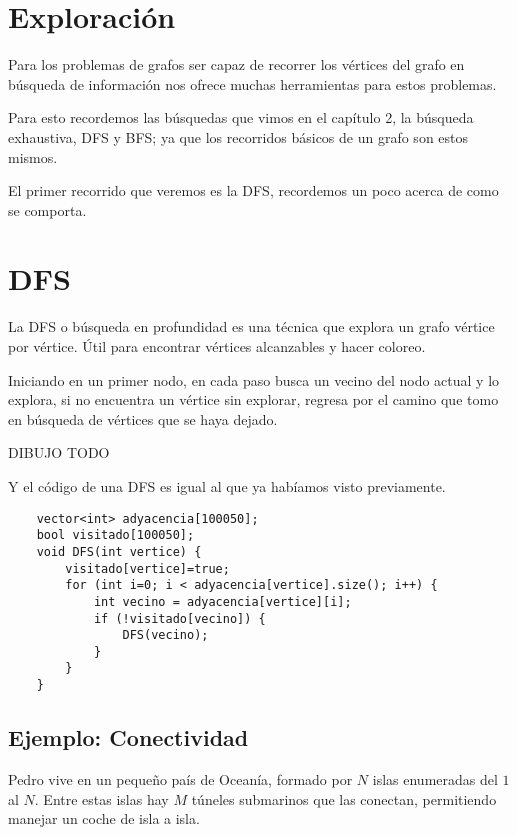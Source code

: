 \chapter{Exploración}

Para los problemas de grafos ser capaz de recorrer los vértices del grafo en búsqueda de información nos ofrece muchas herramientas para estos problemas.  

Para esto recordemos las búsquedas que vimos en el capítulo 2, la búsqueda exhaustiva, DFS y BFS; ya que los recorridos básicos de un grafo son estos mismos.

El primer recorrido que veremos es la DFS, recordemos un poco acerca de como se comporta.

\chapter{DFS}

La DFS o búsqueda en profundidad es una técnica que explora un grafo vértice por vértice. Útil para encontrar vértices alcanzables y hacer coloreo. 

Iniciando en un primer nodo, en cada paso busca un vecino del nodo actual y lo explora, si no encuentra un vértice sin explorar, regresa por el camino que tomo en búsqueda de vértices que se haya dejado.


\begin{center}
	DIBUJO TODO
\end{center}


\pagebreak

Y el código de una DFS es igual al que ya habíamos visto previamente.

\begin{lstlisting}
	vector<int> adyacencia[100050];
	bool visitado[100050];
	void DFS(int vertice) {
		visitado[vertice]=true;
		for (int i=0; i < adyacencia[vertice].size(); i++) {
			int vecino = adyacencia[vertice][i];
			if (!visitado[vecino]) {
				DFS(vecino);
			}
		}
	}
\end{lstlisting}

\section*{Ejemplo: Conectividad}

Pedro vive en un pequeño país de Oceanía, formado por \(N\) islas enumeradas del \(1\) al \(N\). Entre estas islas hay \(M\) túneles submarinos que las conectan, permitiendo manejar un coche de isla a isla. 


